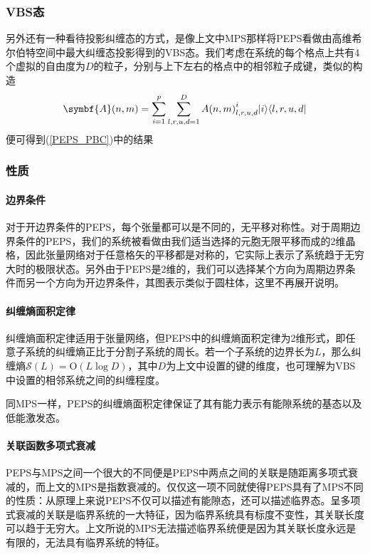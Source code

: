 \subsubsection{VBS态}

另外还有一种看待投影纠缠态的方式，是像上文中MPS那样将PEPS看做由高维希尔伯特空间中最大纠缠态投影得到的VBS态。我们考虑在系统的每个格点上共有4个虚拟的自由度为$D$的粒子，分别与上下左右的格点中的相邻粒子成键，类似的构造
\begin{equation}
\symbf{A}(n,m) = \sum_{i=1}^p\sum_{l,r,u,d=1}^D {A(n,m)}^i_{l,r,u,d}\ket{i}\bra{l,r,u,d}
\end{equation}
便可得到(\ref{PEPS_PBC})中的结果

\subsubsection{性质}

\paragraph{边界条件}

对于开边界条件的PEPS，每个张量都可以是不同的，无平移对称性。对于周期边界条件的PEPS，我们的系统被看做由我们适当选择的元胞无限平移而成的2维晶格，因此张量网络对于任意格矢的平移都是对称的，它实际上表示了系统趋于无穷大时的极限状态。另外由于PEPS是2维的，我们可以选择某个方向为周期边界条件而另一个方向为开边界条件\cite[3]{osorioireguiInfiniteMatrixProduct2017}，其图表示类似于圆柱体，这里不再展开说明。

\paragraph{纠缠熵面积定律}

纠缠熵面积定律适用于张量网络，但PEPS中的纠缠熵面积定律为2维形式，即任意子系统的纠缠熵正比于分割子系统的周长。若一个子系统的边界长为$L$，那么纠缠熵$\mathcal{S}(L)=\mathrm{O}(L\log\!D)$，其中$D$为上文中设置的键的维度，也可理解为VBS中设置的相邻系统之间的纠缠程度。

同MPS一样，PEPS的纠缠熵面积定律保证了其有能力表示有能隙系统的基态以及低能激发态。

\paragraph{关联函数多项式衰减}

PEPS与MPS之间一个很大的不同便是PEPS中两点之间的关联是随距离多项式衰减的，而上文的MPS是指数衰减的。仅仅这一项不同就使得PEPS具有了MPS不同的性质：从原理上来说PEPS不仅可以描述有能隙态，还可以描述临界态。呈多项式衰减的关联是临界系统的一大特征，因为临界系统具有标度不变性，其关联长度可以趋于无穷大\cite[138]{PracticalIntroductionTensor2014}。上文所说的MPS无法描述临界系统便是因为其关联长度永远是有限的，无法具有临界系统的特征。


